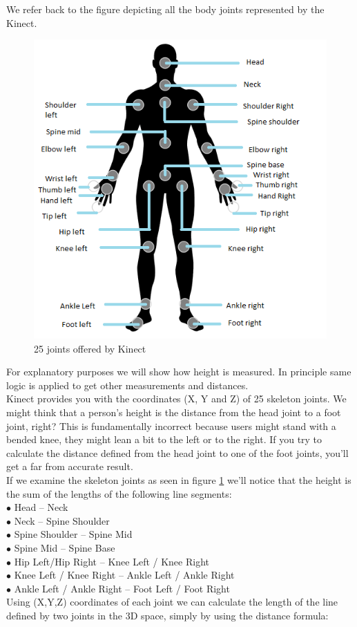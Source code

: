 \noindent We refer back to the figure depicting all the body joints represented by the Kinect.
\begin{figure}[h]
\centering
\includegraphics[scale=0.75]{Figbodjoints.png}
\caption{25 joints offered by Kinect}
\label{fig:Figbodjoints.png}
\end{figure}
\noindent For explanatory purposes we will show how height is measured. In principle same logic is applied to get other measurements and distances.\\
Kinect provides you with the coordinates (X, Y and Z) of 25 skeleton joints. We might think that a person's height is the distance from the head joint to a foot joint, right? This is fundamentally incorrect because users might stand with a bended knee, they might lean a bit to the left or to the right. If you try to calculate the distance defined from the head joint to one of the foot joints, you'll get a far from accurate result.\\
If we examine the skeleton joints as seen in figure \ref{fig:Figbodjoints.png} we'll notice that the height is the sum of the lengths of the following line segments:\\
\noindent$\bullet$   Head – Neck\\
$\bullet$	Neck – Spine Shoulder\\
$\bullet$	Spine Shoulder – Spine Mid\\
$\bullet$	Spine Mid – Spine Base\\
$\bullet$	Hip Left/Hip Right – Knee Left / Knee Right\\
$\bullet$	Knee Left / Knee Right – Ankle Left / Ankle Right\\
$\bullet$	Ankle Left / Ankle Right – Foot Left / Foot Right\\
Using (X,Y,Z) coordinates of each joint we can calculate the length of the line defined by two joints in the 3D space, simply by using the distance formula:

